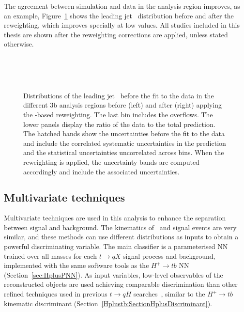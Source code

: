 The agreement between simulation and data in the analysis region improves, as an example, Figure~\ref{tqX:RWeffect} shows the leading jet \pT\ distribution before and after the reweighting, which improves specially at low values. All studies included in this thesis are shown after the reweighting corrections are applied, unless stated otherwise.

\begin{figure}[htb]
    \RawFloats
    \begin{center}
     \\
     \\
     \\
    \caption{
    Distributions of the leading jet \pT\ before the fit to the data in the different 3b analysis regions before (left) and after (right) applying the \HTall-based reweighting. The last bin includes the overflows. 
    The lower panels display the ratio of the data to the total prediction.
    The hatched bands show the uncertainties before the fit to the data and include the correlated systematic uncertainties in the prediction and the statistical uncertainties uncorrelated across bins. When the reweighting is applied, the uncertainty bands are computed accordingly and include the associated uncertainties.    
    }
    \label{tqX:RWeffect}
\end{center}
\end{figure}
\clearpage
\subsection{Multivariate techniques}

Multivariate techniques are used in this analysis to enhance the separation between signal and background. The kinematics of \ttb\ and signal events are very similar, and these methods can use different distributions as inputs to obtain a powerful discriminating variable. The main classifier is a parameterised NN trained over all masses for each $t\to qX$ signal process and background, implemented with the same software tools as the $H^+\to tb$ NN (Section~\ref{sec:HplusPNN}). As input variables, low-level observables of the reconstructed objects are used achieving comparable discrimination than other refined techniques used in previous $t\to qH$ searches~\cite{TOPQ-2017-07}, similar to the $H^+\to tb$ kinematic discriminant (Section~\ref{Hplustb:SectionHplusDiscriminant}).

